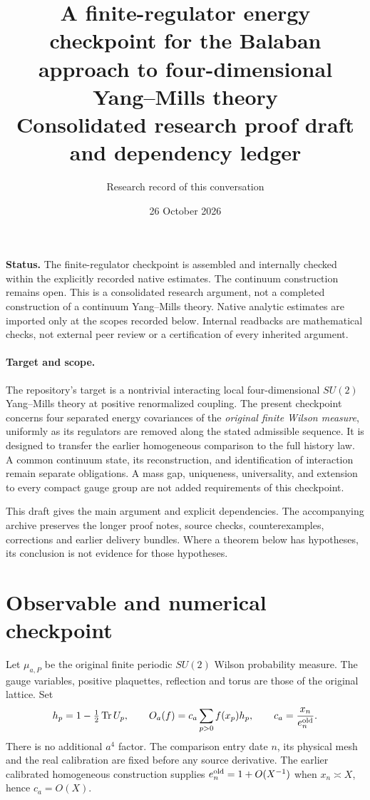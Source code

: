 \documentclass[11pt]{article}
\title{A finite-regulator energy checkpoint for the Balaban approach to four-dimensional Yang--Mills theory\\[4pt]\large Consolidated research proof draft and dependency ledger}
\author{Research record of this conversation}
\date{26 October 2026}
\theoremstyle{definition}\newtheorem{definition}[theorem]{Definition}
\theoremstyle{remark}\newtheorem{remark}[theorem]{Remark}
\newcommand{\Tr}{\operatorname{Tr}}
\begin{document}
\maketitle
\noindent\textbf{Status.} The finite-regulator checkpoint is assembled and internally checked within the explicitly recorded native estimates. The continuum construction remains open. This is a consolidated research argument, not a completed construction of a continuum Yang--Mills theory. Native analytic estimates are imported only at the scopes recorded below. Internal readbacks are mathematical checks, not external peer review or a certification of every inherited argument.

\paragraph{Target and scope.}
The repository's target is a nontrivial interacting local four-dimensional $SU(2)$ Yang--Mills theory at positive renormalized coupling. The present checkpoint concerns four separated energy covariances of the \emph{original finite Wilson measure}, uniformly as its regulators are removed along the stated admissible sequence. It is designed to transfer the earlier homogeneous comparison to the full history law. A common continuum state, its reconstruction, and identification of interaction remain separate obligations. A mass gap, uniqueness, universality, and extension to every compact gauge group are not added requirements of this checkpoint.

This draft gives the main argument and explicit dependencies. The accompanying archive preserves the longer proof notes, source checks, counterexamples, corrections and earlier delivery bundles. Where a theorem below has hypotheses, its conclusion is not evidence for those hypotheses.

\tableofcontents

\section{Observable and numerical checkpoint}
Let $\mu_{a,P}$ be the original finite periodic $SU(2)$ Wilson probability measure. The gauge variables, positive plaquettes, reflection and torus are those of the original lattice. Set
\begin{equation}
 h_p=1-\tfrac12\Tr U_p,\qquad
 O_a(f)=c_a\sum_{p>0}f(x_p)h_p,\qquad
 c_a=\frac{x_n}{e_n^{\rm old}}. \label{observable}
\end{equation}
There is no additional $a^4$ factor. The comparison entry date $n$, its physical mesh and the real calibration are fixed before any source derivative. The earlier calibrated homogeneous construction supplies $e_n^{\rm old}=1+O(X^{-1})$ when $x_n\asymp X$, hence $c_a=O(X)$.
\end{document}
